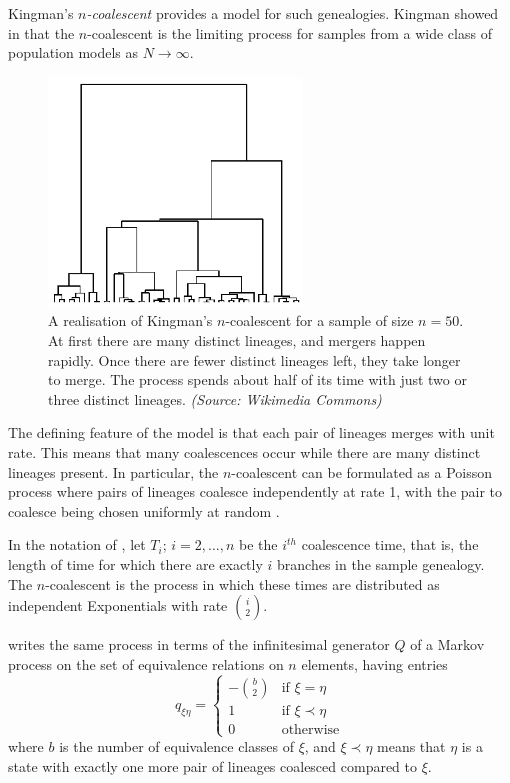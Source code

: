 \documentclass[fleqn]{article}
\begin{document}
Kingman's \emph{$n$-coalescent} provides a model for such genealogies. Kingman showed in \citep{kingman1982gene, kingman1982coal, kingman1982exch} that  the $n$-coalescent is the limiting process for samples from a wide class of population models as $N\to\infty$.

\begin{figure}
\centering
\includegraphics[width=0.6\textwidth]{kingman.png}
\caption{A realisation of Kingman's $n$-coalescent for a sample of size $n=50$. At first there are many distinct lineages, and mergers happen rapidly. Once there are fewer distinct lineages left, they take longer to merge. The process spends about half of its time with just two or three distinct lineages. \textit{(Source: Wikimedia Commons)}}
\label{fig:kingman}
\end{figure}

The defining feature of the model is that each pair of lineages merges with unit rate. This means that many coalescences occur while there are many distinct lineages present.
In particular, the $n$-coalescent can be formulated as a Poisson process where pairs of lineages coalesce independently at rate 1, with the pair to coalesce being chosen uniformly at random \citep[Section 3.2]{wakeley2009}.

In the notation of \citet{wakeley2009}, let $T_i;\, i=2,\dots,n$ be the $i^{th}$ coalescence time, that is, the length of time for which there are exactly $i$ branches in the sample genealogy. The $n$-coalescent is the process in which these times are distributed as independent Exponentials with rate $\binom{i}{2}$.

\citet{mohle1998} writes the same process in terms of the infinitesimal generator $Q$ of a Markov process on the set of equivalence relations on $n$ elements, having entries
\begin{equation*}
q_{\xi\eta} =
\begin{cases}
-\binom{b}{2} &\text{if }\xi=\eta \\
1 & \text{if }\xi \prec\eta \\
0 & \text{otherwise}
\end{cases}
\end{equation*}
where $b$ is the number of equivalence classes of $\xi$, and $\xi \prec \eta$ means that $\eta$ is a state with exactly one more pair of lineages coalesced compared to $\xi$.
 
\end{document}
